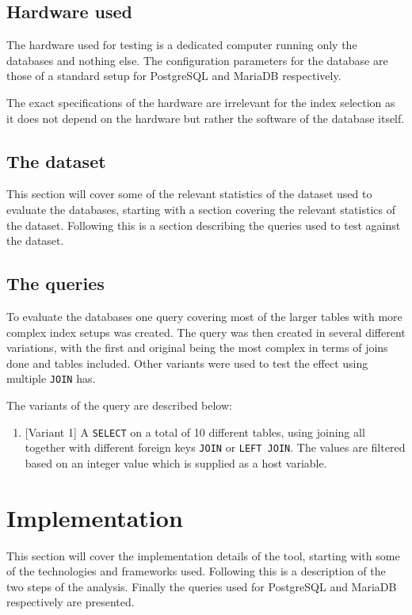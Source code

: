 \subsection{Hardware used}
The hardware used for testing is a dedicated computer running only the databases
and nothing else. The configuration parameters for the database are those of a
standard setup for PostgreSQL and MariaDB respectively.

The exact specifications of the hardware are irrelevant for the index selection
as it does not depend on the hardware but rather the software of the database itself.

\subsection{The dataset}
This section will cover some of the relevant statistics of the dataset used to
evaluate the databases, starting with a section covering the relevant statistics
of the dataset. Following this is a section describing the queries used to test
against the dataset.

\subsection{The queries}\label{sec:queries}
To evaluate the databases one query covering most of the larger tables with more
complex index setups was created. The query was then created in several
different variations, with the first and original being the most complex in
terms of joins done and tables included. Other variants were used to test the
effect using multiple \texttt{JOIN} has.

The variants of the query are described below:
\begin{enumerate}
\item\label{eval:query:variant1} [Variant 1] A \texttt{SELECT} on a total of 10 different tables, using
  joining all together with different foreign keys \texttt{JOIN} or
  \texttt{LEFT JOIN}. The values are filtered based on an integer
  value which is supplied as a host variable.
\end{enumerate}

\section{Implementation}
This section will cover the implementation details of the tool, starting with
some of the technologies and frameworks used. Following this is a description of
the two steps of the analysis. Finally the queries used for PostgreSQL and
MariaDB respectively are presented.

